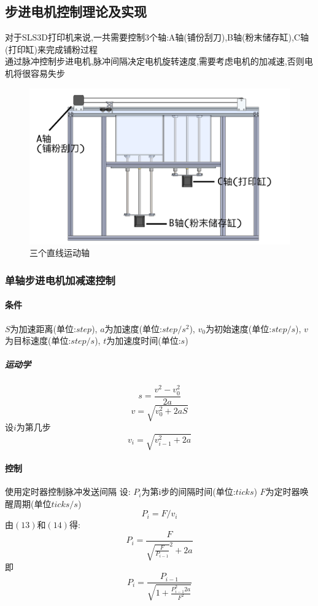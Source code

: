 \documentclass[a4paper,12pt,onecolumn,twoside]{article}
\begin{document}
\subsection{步进电机控制理论及实现}
对于SLS3D打印机来说,一共需要控制3个轴:A轴(铺份刮刀),B轴(粉末储存缸),C轴(打印缸)来完成铺粉过程\\
通过脉冲控制步进电机,脉冲间隔决定电机旋转速度,需要考虑电机的加减速,否则电机将很容易失步
\begin{figure}[ht]
\centering     
\includegraphics[width=\linewidth]{stepper.png}
\caption{三个直线运动轴}
\end{figure}
\subsubsection{单轴步进电机加减速控制}
\paragraph{条件}
$S$为加速距离(单位:$step$),
$a$为加速度(单位:$step/s^2$),
$v_0$为初始速度(单位:$step/s$),
$v$为目标速度(单位:$step/s$),	
$t$为加速度时间(单位:$s$)
\subparagraph{运动学}{
}
\begin{equation}
s=\frac{v^2-v_0^2}{2a}
\end{equation}
\begin{equation}
v=\sqrt{v_0^2+2aS}
\end{equation}
设$i$为第几步
\begin{equation}
v_i=\sqrt{v_{i-1}^2+2a}
\end{equation}
\paragraph{控制}
使用定时器控制脉冲发送间隔 设:
$P_i$为第i步的间隔时间(单位:$ticks$)
$F$为定时器唤醒周期(单位$ticks/s$)
\begin{equation}
P_i=F/v_i 
\end{equation}
由$(13)$和$(14)$得:
\begin{equation}
P_i=\frac{F}{\sqrt{\frac{F}{P_{i-1}}}^2+2a}
\end{equation}
即
\begin{equation}
P_i=\frac{P_{i-1}}{\sqrt{1+\frac{P_{i-1}^2 2 a}{F^2}}}
\end{equation}
\end{document}
